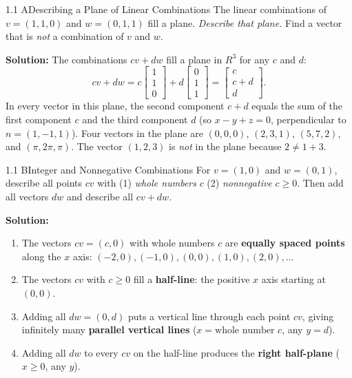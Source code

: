 \documentclass[11pt,a4paper,openany,oneside]{book}
\def\vect#1{#1}%
\def\mathbf#1{#1}%
\newcommand{\vect}[1]{\mathbf{#1}}
\numberwithin{equation}{chapter}
\begin{document}
\begin{example}{1.1 A}{Describing a Plane of Linear Combinations}
The linear combinations of $\vect{v} = (1, 1, 0)$ and $\vect{w} = (0, 1, 1)$ fill a plane. \emph{Describe that plane.} Find a vector that is \emph{not} a combination of $\vect{v}$ and $\vect{w}$.
\end{example}
\textbf{Solution:} The combinations $c\vect{v} + d\vect{w}$ fill a plane in $\mathbf{R}^3$ for any $c$ and $d$:
\[
c\vect{v} + d\vect{w} = c\begin{bmatrix} 1 \\ 1 \\ 0 \end{bmatrix} + d\begin{bmatrix} 0 \\ 1 \\ 1 \end{bmatrix} = \begin{bmatrix} c \\ c + d \\ d \end{bmatrix}.
\]
In every vector in this plane, the second component $c+d$ equals the sum of the first component $c$ and the third component $d$ (so $x - y + z = 0$, perpendicular to $\vect{n}=(1,-1,1)$). Four vectors in the plane are $(0,0,0)$, $(2,3,1)$, $(5,7,2)$, and $(\pi,2\pi,\pi)$. The vector $(1,2,3)$ is \emph{not} in the plane because $2 \neq 1 + 3$.

\begin{example}{1.1 B}{Integer and Nonnegative Combinations}
For $\vect{v} = (1, 0)$ and $\vect{w} = (0, 1)$, describe all points $c\vect{v}$ with (1) \emph{whole numbers} $c$ (2) \emph{nonnegative} $c \ge 0$. Then add all vectors $d\vect{w}$ and describe all $c\vect{v} + d\vect{w}$.
\end{example}
\textbf{Solution:}
\begin{enumerate}
\item[(1)] The vectors $c\vect{v} = (c,0)$ with whole numbers $c$ are \textbf{equally spaced points} along the $x$ axis: $(-2,0), (-1,0), (0,0), (1,0), (2,0), \dots$
\item[(2)] The vectors $c\vect{v}$ with $c \ge 0$ fill a \textbf{half-line}: the positive $x$ axis starting at $(0,0)$.
\item[(1$'$)] Adding all $d\vect{w} = (0,d)$ puts a vertical line through each point $c\vect{v}$, giving infinitely many \textbf{parallel vertical lines} ($x = \text{whole number } c$, any $y = d$).
\item[(2$'$)] Adding all $d\vect{w}$ to every $c\vect{v}$ on the half-line produces the \textbf{right half-plane} ($x \ge 0$, any $y$).
\end{enumerate}
\end{document}
